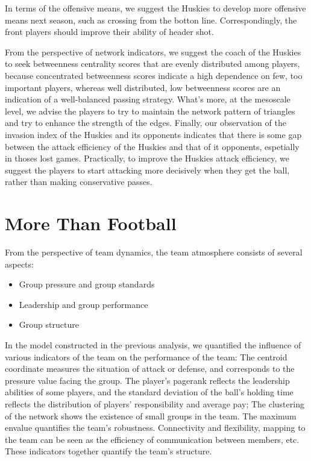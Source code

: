 \documentclass{mcmthesis}
\begin{document}
In terms of the offensive means, we suggest the Huskies to develop more offensive means next season, such as crossing from the botton line. Correspondingly, the front players should improve their ability of header shot.

From the perspective of network indicators, we suggest the coach of the Huskies to seek betweenness centrality scores that are evenly distributed among players, because concentrated betweenness scores indicate a high dependence on few, too important players, whereas well distributed, low betweenness scores are an indication of a well-balanced passing strategy. What's more, at the mesoscale level, we advise the players to try to maintain the network pattern of triangles and try to enhance the strength of the edges. Finally, our observation of the invasion index of the Huskies and its opponents indicates that there is some gap between the attack efficiency of the Huskies and that of it opponents, espetially in thoses lost games. Practically, to improve the Huskies attack efficiency, we suggest the players to start attacking more decisively when they get the ball, rather than making conservative passes.

\section{More Than Football}

From the perspective of team dynamics, the team atmosphere consists of several aspects:
\begin{itemize}
  \item Group pressure and group standards
  \item Leadership and group performance
  \item Group structure
\end{itemize}

In the model constructed in the previous analysis, we quantified the influence of various indicators of the team on the performance of the team: The centroid coordinate measures the situation of attack or defense, and corresponds to the pressure value facing the group. The player's pagerank reflects the leadership abilities of some players, and the standard deviation of the ball's holding time reflects the distribution of players' responsibility and average pay; The clustering of the network shows the existence of small groups in the team. The maximum envalue quantifies the team's robustness. Connectivity and flexibility, mapping to the team can be seen as the efficiency of communication between members, etc. These indicators together quantify the team's structure.
\end{document}
